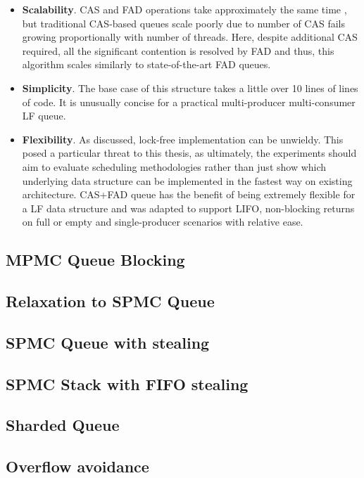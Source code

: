 \documentclass[12pt,a4paper,twoside]{report}
\begin{document}
\begin{itemize}
    \item \textbf{Scalability}. CAS and FAD operations take approximately the same time \cite{fad-cas-speed}, but traditional CAS-based queues scale poorly due to number of CAS fails growing proportionally with number of threads. Here, despite additional CAS required, all the significant contention is resolved by FAD and thus, this algorithm scales similarly to state-of-the-art FAD queues.
    \item \textbf{Simplicity}. The base case of this structure takes a little over 10 lines of lines of code. It is unusually concise for a practical multi-producer multi-consumer LF queue. 
    \item \textbf{Flexibility}. As discussed, lock-free implementation can be unwieldy. This posed a particular threat to this thesis, as ultimately, the experiments should aim to evaluate scheduling methodologies rather than just show which underlying data structure can be implemented in the fastest way on existing architecture. CAS+FAD queue has the benefit of being extremely flexible for a LF data structure and was adapted to support LIFO, non-blocking returns on full or empty and single-producer scenarios with relative ease.
\end{itemize}





\subsection{MPMC Queue Blocking}
\subsection{Relaxation to SPMC Queue}
\subsection{SPMC Queue with stealing}
\subsection{SPMC Stack with FIFO stealing}
\subsection{Sharded Queue}
\subsection{Overflow avoidance}
\end{document}
